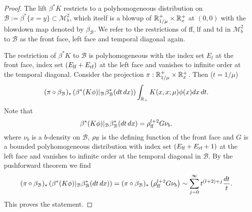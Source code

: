 \begin{proof}
The lift $\beta^* K$ restricts to a polyhomogeneous distribution on
$\mathscr{B}:=\beta^*\{x=y\} \subset \mathscr{M}^2_b$, which itself is a blowup of 
$\mathbb{R}^+_{1/\mu} \times \mathbb{R}^+_x$ at $(0,0)$ with the blowdown map denoted 
by $\beta_{\mathscr{B}}$. We refer to the restrictions of ff, lf and td in 
$\mathscr{M}^2_b$ to $\mathscr{B}$ as the front face, left face and 
temporal diagonal again. 

The restriction of $\beta^*K$ to $\mathscr{B}$ is polyhomogeneous 
with the index set $E_l$ at the front face, index set $(E_{\textup{lf}}+ E_{\textup{rf}})$ 
at the left face and vanishes to infinite order at the temporal diagonal.
Consider the projection $\pi: \mathbb{R}^+_{1/\mu} \times \mathbb{R}^+_x$. Then ($t=1/\mu$)
\begin{align*}
(\pi \circ \beta_{\mathcal{B}})_* \left( \beta^*(K\phi)|_{\mathcal{B}} 
\beta^*_{\mathcal{B}}(dt \, dx)\right) 
 \int_{\mathbb{R}_+} K(x,x;\mu) \phi(x) dx \, dt.
\end{align*}
Note that 
\[
\beta^*(K\phi)|_{\mathcal{B}} \beta^*_{\mathcal{B}}(dt \, dx)  
= \rho_{\textup{ff}}^{l+2} G \nu_b.
\]
where $\nu_b$ is a $b$-density on $\mathscr{B}$, $\rho_{\textup{ff}}$ is the 
defining function of the front face and $G$ is a bounded polyhomogeneous 
distribution with index set $(E_{\textup{lf}} + E_{\textup{rf}} + 1)$ 
at the left face and vanishes to infinite order at the temporal diagonal 
in $\mathscr{B}$. By the pushforward theorem we find
\begin{align*}
(\pi \circ \beta_{\mathcal{B}})_* \left( \beta^*(K\phi)|_{\mathcal{B}} 
\beta^*_{\mathcal{B}}(dt \, dx)\right) = 
(\pi \circ \beta_{\mathcal{B}})_* \left( \rho_{\textup{ff}}^{l+2} G \nu_b \right) 
\sim \sum_{j=0}^\infty t^{(l+2)+j} \frac{dt}{t}.
\end{align*}
This proves the statement.
\end{proof}

